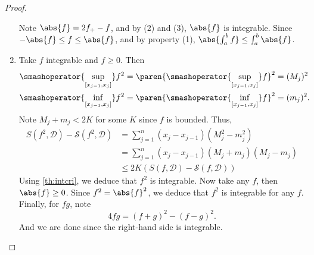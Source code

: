 \begin{proof}
\begin{enumerate}
        Note \(\abs{f} = 2f_+ - f\), and by (2) and (3), \(\abs{f}\) is integrable. Since \(-\abs{f} \leq f \leq \abs{f}\), and by property (1), \(\abs{\int^b_a f}\leq \int^b_a\abs{f}\).
        \item Take \(f\) integrable and \(f \geq 0\). Then
        \begin{align*}
            \smashoperator{\sup_{[x_{j-1},x_j]}}f^2 &= \paren{\smashoperator{\sup_{[x_{j-1},x_j]}}f}^2 = (M_j)^2\\
            \smashoperator{\inf_{[x_{j-1},x_j]}}f^2 &= \paren{\smashoperator{\inf_{[x_{j-1},x_j]}}f}^2 = (m_j)^2.
        \end{align*}
        Note \(M_j + m_j<2K\) for some \(K\) since \(f\) is bounded. Thus,
        \begin{align*}
            S(f^2, \mathcal{D}) - \mathscr{S}(f^2, \mathcal{D}) &= \sum_{j=1}^{n} (x_j - x_{j-1})(M^2_j - m^2_j)\\
            &= \sum_{j=1}^{n} (x_j - x_{j-1})(M_j + m_j)(M_j - m_j)\\
            &\leq 2K(S(f,\mathcal{D}) - \mathscr{S}(f, \mathcal{D}))
        \end{align*}
        Using \cref{th:intcri}, we deduce that \(f^2\) is integrable. Now take any \(f\), then \(\abs{f}\geq 0\). Since \(f^2 = \abs{f}^2\), we deduce that \(f^2\) is integrable for any \(f\). Finally, for \(fg\), note
        \[
            4fg = (f + g)^2 - (f-g)^2.
        \]
        And we are done since the right-hand side is integrable.
    \end{enumerate}
\end{proof}